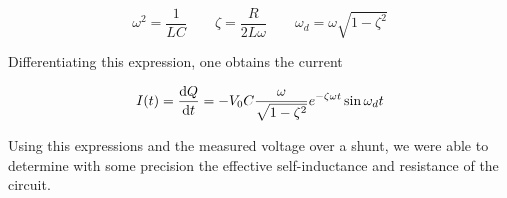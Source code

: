 $$
\omega^2 = \frac{1}{LC} \qquad
\zeta = \frac{R}{2L \omega} \qquad
\omega_d = \omega \sqrt{1-\zeta^2}
$$

Differentiating this expression, one obtains the current

$$
\label{current}
I(t) = \frac{\mathrm d Q}{\mathrm d t} = -V_0 C \frac{\omega}{\sqrt{1-\zeta^2}} e^{-\zeta \omega 
t} \sin{\omega_d t}
$$

Using this expressions and the measured voltage over a shunt, we were able to 
determine with some precision the effective self-inductance and resistance of 
the circuit.
